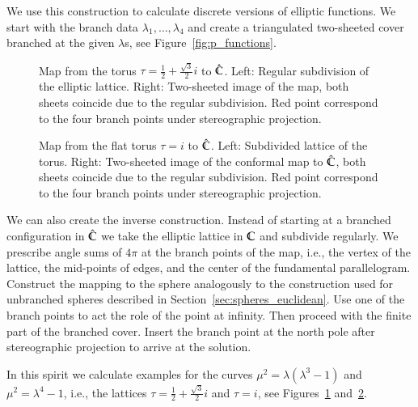 \documentclass[Thesis.tex]{subfiles}
\begin{document}
We use this construction to calculate discrete versions of elliptic functions.
We start with the branch data $\lambda_1,\ldots,\lambda_{4}$ and create a triangulated two-sheeted cover branched at the given $\lambda$s, see Figure~\ref{fig:p_functions}.


\begin{figure}
\centering
{}
\caption{
Map from the torus $\tau=\frac{1}{2}+\frac{\sqrt 3}{2}i$ to $\hat{\mathbb C}$. 
Left: Regular subdivision of the elliptic lattice. 
Right: Two-sheeted image of the map, both sheets coincide due to the regular subdivision. 
Red point correspond to the four branch points under stereographic projection.
} 
\label{fig:wente_elliptic}
\end{figure}

\begin{figure}
\centering
{}
\caption{
Map from the flat torus $\tau=i$ to $\hat{\mathbb C}$. 
Left: Subdivided lattice of the torus. 
Right: Two-sheeted image of the conformal map to $\hat{\mathbb C}$, both sheets coincide due to the regular subdivision. 
Red point correspond to the four branch points under stereographic projection.
}
\label{fig:square_elliptic} 
\end{figure}

We can also create the inverse construction. 
Instead of starting at a branched configuration in $\hat {\mathbb C}$ we take the elliptic lattice in $\mathbb C$ and subdivide regularly.
We prescribe angle sums of $4\pi$ at the branch points of the map, i.e., the vertex of the lattice, the mid-points of edges, and the center of the fundamental parallelogram.
Construct the mapping to the sphere analogously to the construction used for unbranched spheres described in Section~\ref{sec:spheres_euclidean}.
Use one of the branch points to act the role of the point at infinity.
Then proceed with the finite part of the branched cover.
Insert the branch point at the north pole after stereographic projection to arrive at the solution.

In this spirit we calculate examples for the curves $\mu^2=\lambda(\lambda^3-1)$ and $\mu^2=\lambda^4-1$, i.e., the lattices $\tau=\frac{1}{2}+\frac{\sqrt 3}{2}i$ and $\tau=i$, see Figures~\ref{fig:wente_elliptic} and~\ref{fig:square_elliptic}.
\end{document}
